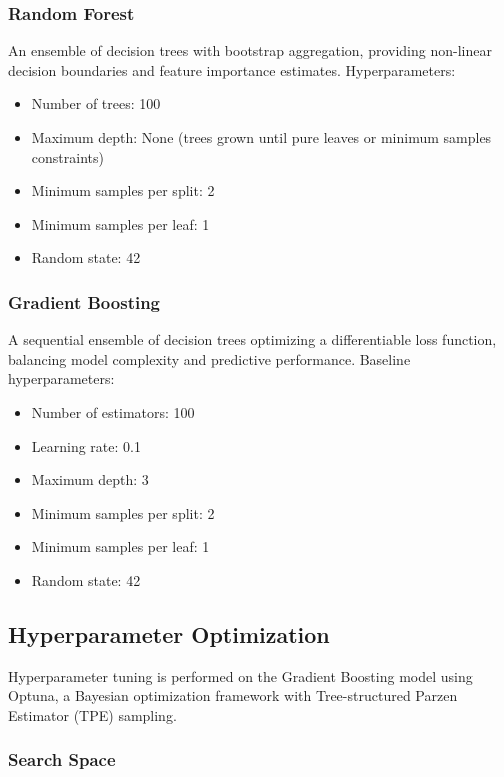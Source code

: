 \documentclass[11pt,a4paper]{article}
\begin{document}
\subsubsection{Random Forest}

An ensemble of decision trees with bootstrap aggregation, providing non-linear decision boundaries and feature importance estimates. Hyperparameters:
\begin{itemize}
    \item Number of trees: 100
    \item Maximum depth: None (trees grown until pure leaves or minimum samples constraints)
    \item Minimum samples per split: 2
    \item Minimum samples per leaf: 1
    \item Random state: 42
\end{itemize}

\subsubsection{Gradient Boosting}

A sequential ensemble of decision trees optimizing a differentiable loss function, balancing model complexity and predictive performance. Baseline hyperparameters:
\begin{itemize}
    \item Number of estimators: 100
    \item Learning rate: 0.1
    \item Maximum depth: 3
    \item Minimum samples per split: 2
    \item Minimum samples per leaf: 1
    \item Random state: 42
\end{itemize}

\subsection{Hyperparameter Optimization}

Hyperparameter tuning is performed on the Gradient Boosting model using Optuna, a Bayesian optimization framework with Tree-structured Parzen Estimator (TPE) sampling.

\subsubsection{Search Space}
\end{document}
